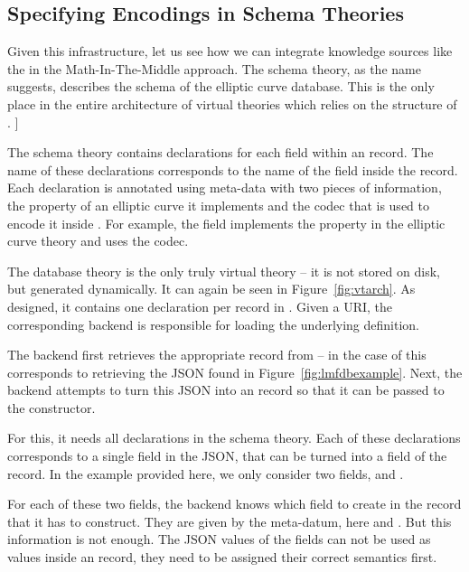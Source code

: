 \subsection{Specifying Encodings in Schema Theories}

Given this infrastructure, let us see how we can integrate knowledge sources like the \lmfdb in the Math-In-The-Middle approach. 
The schema theory, as the name suggests, describes the schema of the \lmfdb elliptic curve database. 
This is the only place in the entire architecture of virtual theories which relies on the structure of \lmfdb. ]

The schema theory contains declarations for each field within an \lmfdb record. 
The name of these declarations corresponds to the name of the field inside the record. 
Each declaration is annotated using \mmt meta-data with two pieces of information, the property of an elliptic curve it implements and the codec that is used to encode it inside \lmfdb. 
For example, the  field implements the  property in the elliptic curve theory and uses the  codec.

The database theory is the only truly virtual theory -- it is not stored on disk, but generated dynamically. 
It can again be seen in Figure~\ref{fig:vtarch}. 
As designed, it contains one declaration per record in \lmfdb. 
Given a URI, the corresponding backend is responsible for loading the underlying definition.

The backend first retrieves the appropriate record from {\lmfdb} -- in the case of  this corresponds to retrieving the JSON found in Figure~\ref{fig:lmfdbexample}. 
Next, the backend attempts to turn this JSON into an \mmt record so that it can be passed to the  constructor.

For this, it needs all declarations in the schema theory. 
Each of these declarations corresponds to a single field in the JSON, that can be turned into a field of the \mmt record. 
In the example provided here, we only consider two fields,  and .

For each of these two fields, the backend knows which field to create in the \mmt record that it has to construct. 
They are given by the  meta-datum, here  and . 
But this information is not enough. 
The JSON values of the fields can not be used as values inside an \mmt record, they need to be assigned their correct semantics first.

